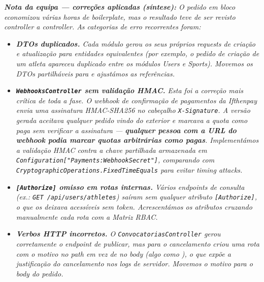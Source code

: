 
\noindent\textit{\textbf{Nota da equipa --- correções aplicadas (síntese):} O pedido em bloco economizou várias horas de \textit{boilerplate}, mas o resultado teve de ser revisto \textit{controller} a \textit{controller}. As categorias de erro recorrentes foram:}
\begin{itemize}
    \item \textit{\textbf{DTOs duplicados.} Cada módulo gerou os seus próprios \textit{requests} de criação e atualização para entidades equivalentes (por exemplo, o pedido de criação de um atleta apareceu duplicado entre os módulos Users e Sports). Movemos os DTOs partilháveis para  e ajustámos as referências.}
    \item \textit{\textbf{\texttt{WebhooksController} sem validação HMAC.} Esta foi a correção mais crítica de toda a fase. O \textit{webhook} de confirmação de pagamentos da Ifthenpay envia uma assinatura HMAC-SHA256 no cabeçalho \texttt{X-Signature}. A versão gerada aceitava qualquer pedido vindo do exterior e marcava a quota como paga sem verificar a assinatura --- \textbf{qualquer pessoa com a URL do webhook podia marcar quotas arbitrárias como pagas}. Implementámos a validação HMAC contra a chave partilhada armazenada em \texttt{Configuration["Payments:WebhookSecret"]}, comparando com \texttt{CryptographicOperations.FixedTimeEquals} para evitar \textit{timing attacks}.}
    \item \textit{\textbf{\texttt{[Authorize]} omisso em rotas internas.} Vários \textit{endpoints} de consulta (ex.: \texttt{GET /api/users/athletes}) saíram sem qualquer atributo \texttt{[Authorize]}, o que os deixava acessíveis sem token. Acrescentámos os atributos cruzando manualmente cada rota com a Matriz RBAC.}
    \item \textit{\textbf{Verbos HTTP incorretos.} O \texttt{ConvocatoriasController} gerou corretamente o \textit{endpoint} de publicar, mas para o cancelamento criou uma rota com o motivo no \textit{path} em vez de no \textit{body} (algo como ), o que expõe a justificação do cancelamento nos \textit{logs} de servidor. Movemos o motivo para o \textit{body} do pedido.}
\end{itemize}

